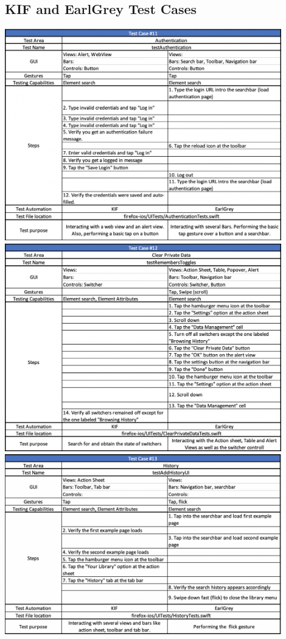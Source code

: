 \subsection{KIF and EarlGrey Test Cases}
\includegraphics[width=12cm]{img/tc11.png} \\[2mm]
\includegraphics[width=12cm]{img/tc12.png} \\[2mm]
\includegraphics[width=12cm]{img/tc13.png} \\[2mm]

